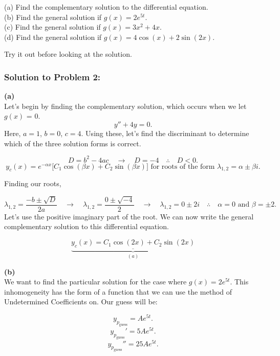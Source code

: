 \documentclass[a4paper,12pt]{article}
\begin{document}
(a) Find the complementary solution to the differential equation.\\

(b) Find the general solution if $g(x) = 2e^{5t}$.\\

(c) Find the general solution if $g(x) = 3x^2 + 4x$.\\

(d) Find the general solution if $g(x) = 4\cos(x) + 2\sin(2x)$.\\

\vspace{.5in}
 
Try it out before looking at the solution.
\pagebreak
 
 \subsubsection*{Solution to Problem 2:}

\textbf{(a)}\\
Let's begin by finding the complementary solution, which occurs when we let $g(x)$ = 0.
$$ y'' + 4y = 0. $$
Here, $a = 1$, $b=0$, $c=4$. Using these, let's find the discriminant to determine which of the three solution forms is correct.

$$ D = b^2 - 4ac \quad\rightarrow\quad D = -4 \quad\therefore\quad D<0.$$
$$ y_c(x) = e^{-\alpha x}\bigg[C_1\cos{(\beta x) + C_2\sin{(\beta x)}}\bigg] \text{ for roots of the form } \lambda_{1,2} = \alpha \pm \beta i.$$

Finding our roots,

$$ \lambda_{1,2} = \frac{-b \pm \sqrt{D}}{2a} \quad\rightarrow\quad \lambda_{1,2} = \frac{0 \pm \sqrt{-4}}{2} \quad\rightarrow\quad \lambda_{1,2} = 0 \pm 2i\quad\therefore\quad \alpha = 0 \text{ and }\beta = \pm 2.$$
Let's use the positive imaginary part of the root. We can now write the general complementary solution to this differential equation.

$$ \underbrace{\underline{\boxed{y_c(x) = C_1\cos{(2x)} + C_2\sin{(2x)}}}}_{(a)} $$

\textbf{(b)}\\
We want to find the particular solution for the case where $g(x) = 2e^{5t}$. This inhomogeneity has the form of a function that we can use the method of Undetermined Coefficients on. Our guess will be:

$$ y_{p_{\text{guess}}} = Ae^{5t}. $$
$$ y_{p_{\text{guess}}}' = 5Ae^{5t}. $$
$$ y_{p_{\text{guess}}}'' = 25Ae^{5t}. $$
\end{document}
